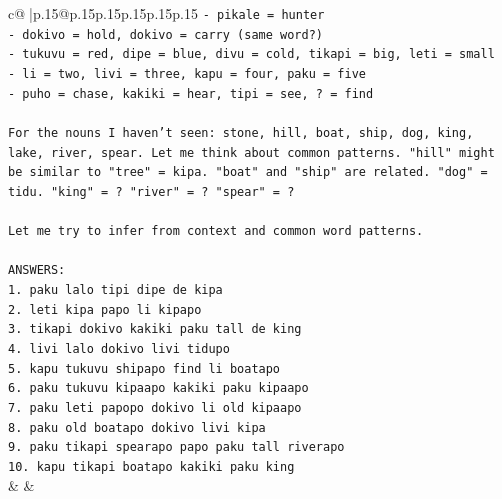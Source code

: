 \documentclass{article}
\begin{document}
{\begin{supertabular}{c@{$\;$}|p{.15\linewidth}@{}p{.15\linewidth}p{.15\linewidth}p{.15\linewidth}p{.15\linewidth}p{.15\linewidth}}
{{{\texttt{{-} pikale = hunter} \\
\texttt{{-} dokivo = hold, dokivo = carry (same word?)} \\
\texttt{{-} tukuvu = red, dipe = blue, divu = cold, tikapi = big, leti = small} \\
\texttt{{-} li = two, livi = three, kapu = four, paku = five} \\
\texttt{{-} puho = chase, kakiki = hear, tipi = see, ? = find} \\
\\ 
\texttt{For the nouns I haven't seen: stone, hill, boat, ship, dog, king, lake, river, spear. Let me think about common patterns. "hill" might be similar to "tree" = kipa. "boat" and "ship" are related. "dog" = tidu. "king" = ? "river" = ? "spear" = ?} \\
\\ 
\texttt{Let me try to infer from context and common word patterns.} \\
\\ 
\texttt{ANSWERS:} \\
\texttt{1. paku lalo tipi dipe de kipa} \\
\texttt{2. leti kipa papo li kipapo} \\
\texttt{3. tikapi dokivo kakiki paku tall de king} \\
\texttt{4. livi lalo dokivo livi tidupo} \\
\texttt{5. kapu tukuvu shipapo find li boatapo} \\
\texttt{6. paku tukuvu kipaapo kakiki paku kipaapo} \\
\texttt{7. paku leti papopo dokivo li old kipaapo} \\
\texttt{8. paku old boatapo dokivo livi kipa} \\
\texttt{9. paku tikapi spearapo papo paku tall riverapo} \\
\texttt{10. kapu tikapi boatapo kakiki paku king} \\
            }
        }
    }
    & & \\ \\


\end{supertabular}}
\end{document}
